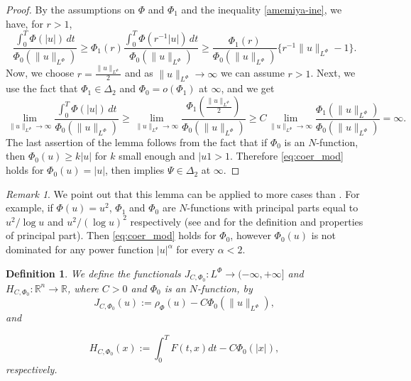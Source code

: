 \documentclass[twoside]{article}
\newtheorem{defi}[thm]{Definition}
\theoremstyle{remark}
\newtheorem{comentario}{Remark}
\newcommand{\orlnor}{\|_{L^{\Phi}}}
\newcommand{\lphi}{L^{\Phi}}
\newcommand{\rr}{\mathbb{R}}
\renewcommand{\geq}{\geqslant}
\begin{document}
\begin{proof}
By the assumptions on $\Phi$ and $\Phi_1$  and the inequality \eqref{amemiya-ine}, we have, for $r>1$,
\[
\frac{\int_0^T \Phi(|u|)\,dt}{\Phi_0(\|u\orlnor)}\geq
\Phi_1(r) \frac{\int_0^T \Phi(r^{-1}|u|)\,dt}{\Phi_0(\|u\orlnor)}\geq
\frac{\Phi_1(r)}{\Phi_0(\|u\orlnor)}\{r^{-1}\|u\orlnor-1\}.
\]
Now, we choose $r=\frac{\|u\orlnor}{2}$ and as $\|u\orlnor\to\infty$ we can assume $r>1$.
Next, we use the fact that $\Phi_1\in\Delta_2$ and
$\Phi_0=o(\Phi_1)$ at $\infty$, and  we get
\[
\lim\limits_{\|u\orlnor \to \infty} \frac{\int_0^T \Phi(|u|)\,dt}{\Phi_0(\|u\orlnor)}\geq
\lim\limits_{\|u\orlnor \to \infty} \frac{\Phi_1\left(\frac{\|u\orlnor}{2}\right)}{\Phi_0(\|u\orlnor)}
\geq
C \lim\limits_{\|u\orlnor \to \infty} \frac{\Phi_1(\|u\orlnor)}{\Phi_0(\|u\orlnor)}=\infty.
\]
The last assertion of the lemma follows from the fact that if $\Phi_0$ is an $N$-function, then $\Phi_0(u)\geq k|u|$ for  $k$ small enough and $|u1>1$. Therefore \eqref{eq:coer_mod} holds for $\Phi_0(u)=|u|$, then \cite[Lemma 5.2]{ABGMS2015}  implies  $\Psi\in\Delta_2$ at $\infty$.
\end{proof}


\begin{comentario}  We point out that this lemma can be applied to more cases than \cite[Lemma 5.2]{ABGMS2015}. For example, if $\Phi(u)=u^2$, $\Phi_1$ and $\Phi_0$ are  $N$-functions with principal parts equal to $u^2/\log u$ and $u^2/(\log u)^2$ respectively (see \cite[p. 16]{KR} and \cite[Section 7]{KR} for the definition and properties of principal part). Then  \eqref{eq:coer_mod} holds for $\Phi_0$, however $\Phi_0(u)$ is not dominated for any  power function $|u|^{\alpha}$ for every $\alpha<2$. 
\end{comentario}






\begin{defi}We define the  functionals $J_{C,\Phi_0}:\lphi\to (-\infty,+\infty]$ and $  H_{C,\Phi_0}:\rr^n\to \rr$, where $C>0$ and $\Phi_0$ is an $N$-function, by
\begin{equation}\label{func_phi}
  J_{C,\Phi_0}(u):= \rho_{\Phi}\left(u\right)-C\Phi_0\left(\|u\orlnor\right),
\end{equation}
 and

\begin{equation}\label{eq:functional_H-bis}
 H_{C,\Phi_0}(x):=\int_0^TF(t,x)dt-C\Phi_0(|x|),
\end{equation}
respectively.
\end{defi}
\end{document}
